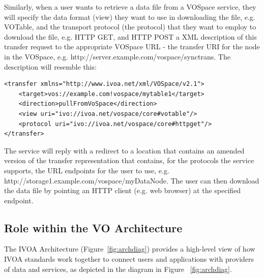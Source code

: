 \documentclass[11pt,a4paper]{ivoa}
\begin{document}
Similarly, when a user wants to retrieve a data file from a VOSpace service, they will specify the data format (view) they want to use in downloading the file, e.g. VOTable, and the transport protocol (the protocol) that they want to employ to download the file, e.g. HTTP GET, and HTTP POST a XML description of this transfer request to the appropriate VOSpace URL - the transfer URI for the node in the VOSpace, e.g. http://server.example.com/vospace/synctrans. The description will resemble this:

\begin{lstlisting}
<transfer xmlns="http://www.ivoa.net/xml/VOSpace/v2.1">
    <target>vos://example.com!vospace/mytable1</target>
    <direction>pullFromVoSpace</direction> 
    <view uri="ivo://ivoa.net/vospace/core#votable"/> 
    <protocol uri="ivo://ivoa.net/vospace/core#httpget"/>  
</transfer>
\end{lstlisting}

The service will reply with a redirect to a location that contains an amended version of the transfer representation that contains, for the protocols the service supports, the URL endpoints for the user to use, e.g. http://storage1.example.com/vospace/myDataNode. The user can then download the data file by pointing an HTTP client (e.g. web browser) at the specified endpoint.

\subsection{Role within the VO Architecture}
\label{subsec:role within the vo architecture}

The IVOA Architecture (Figure~\ref{fig:archdiag}) provides a high-level view of how IVOA standards work together to connect users and applications with providers of data and services, as depicted in the diagram in Figure ~\ref{fig:archdiag}.
\end{document}
